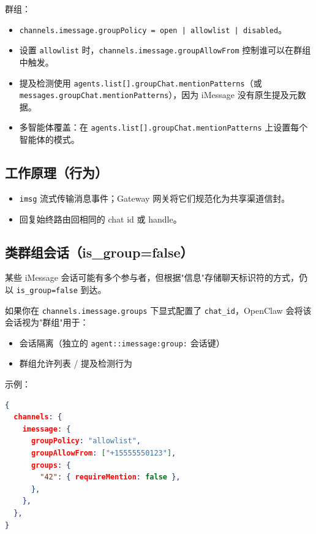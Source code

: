 群组：

\begin{itemize}
  \item \texttt{channels.imessage.groupPolicy = open | allowlist | disabled}。
  \item 设置 \texttt{allowlist} 时，\texttt{channels.imessage.groupAllowFrom} 控制谁可以在群组中触发。
  \item 提及检测使用 \texttt{agents.list[].groupChat.mentionPatterns}（或 \texttt{messages.groupChat.mentionPatterns}），因为 iMessage 没有原生提及元数据。
  \item 多智能体覆盖：在 \texttt{agents.list[].groupChat.mentionPatterns} 上设置每个智能体的模式。
\end{itemize}


\subsection{工作原理（行为）}


\begin{itemize}
  \item \texttt{imsg} 流式传输消息事件；Gateway 网关将它们规范化为共享渠道信封。
  \item 回复始终路由回相同的 chat id 或 handle。
\end{itemize}


\subsection{类群组会话（is\_group=false）}


某些 iMessage 会话可能有多个参与者，但根据"信息"存储聊天标识符的方式，仍以 \texttt{is\_group=false} 到达。

如果你在 \texttt{channels.imessage.groups} 下显式配置了 \texttt{chat\_id}，OpenClaw 会将该会话视为"群组"用于：

\begin{itemize}
  \item 会话隔离（独立的 \texttt{agent::imessage:group:} 会话键）
  \item 群组允许列表 / 提及检测行为
\end{itemize}


示例：

\begin{lstlisting}[language=json]
{
  channels: {
    imessage: {
      groupPolicy: "allowlist",
      groupAllowFrom: ["+15555550123"],
      groups: {
        "42": { requireMention: false },
      },
    },
  },
}
\end{lstlisting}


